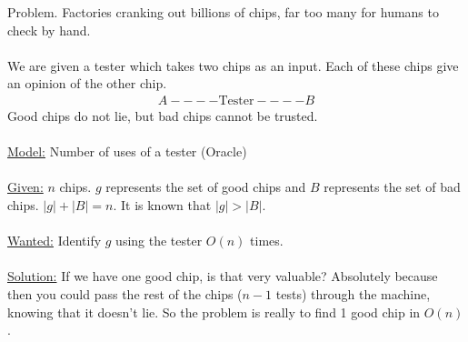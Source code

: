 \documentclass[class=scrartcl, crop=false]{standalone}
\begin{document}
\begin{example}
  Problem. Factories cranking out billions of chips, far too many for humans to check by hand.
  \\\\
  We are given a tester which takes two chips as an input. Each of these chips give an opinion of the other chip.
  \begin{gather*}
    A ---- \text{Tester} ---- B
  \end{gather*} 
  Good chips do not lie, but bad chips cannot be trusted.
  \\\\
  \ul{Model:} Number of uses of a tester (Oracle)
  \\\\
  \ul{Given:} $n$ chips. $g$ represents the set of good chips and $B$ represents the set of bad chips. $|g| + |B| = n$. It is known that $|g| > |B|$.
  \\\\
  \ul{Wanted:} Identify $g$ using the tester $O(n)$ times.
  \\\\
  \ul{Solution:} If we have one good chip, is that very valuable? Absolutely because then you could pass the rest of the chips ($n - 1$ tests) through the machine, knowing that it doesn't lie. So the problem is really to find 1 good chip in $O(n)$.


\end{example}
\end{document}
